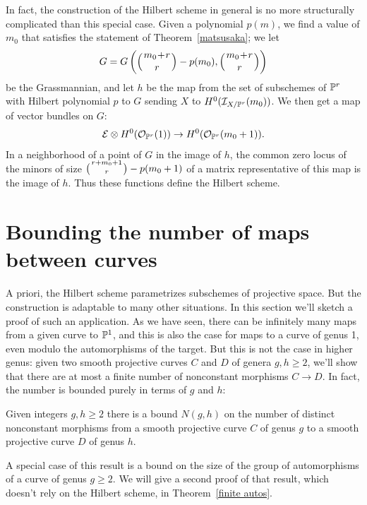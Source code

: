 In fact, the construction of the Hilbert scheme in general is no more
structurally complicated than this special case. Given a polynomial
$p(m)$, we find a value of $m_0$ that satisfies the statement of
Theorem~\ref{matsusaka}; we let
%
$$
G = G\left(\mbinom{m_0+r}{r} - p(m_0), \mbinom{m_0+r}{r} \right)
$$
be the Grassmannian, and let $h$ be the map from the set of
subschemes of ${\mathbb P}^r$ with Hilbert polynomial $p$ to $G$ sending $X$
to $H^0({\mathcal I}_{X/{\mathbb P}^r}(m_0))$. We then get a map of vector bundles  on $G$:
$$
{\mathcal E} \otimes H^0({\mathcal O}_{{\mathbb P}^r}(1)) \to H^0({\mathcal O}_{{\mathbb P}^r}(m_0+1)).
$$
In a neighborhood of a point of $G$ in the image of $h$, the common zero
locus of the minors of size $\tbinom{r+m_0+1}{r} - p(m_0+1)$ of a matrix
representative of this map is the image of $h$. Thus these functions
define the Hilbert scheme.

\section{Bounding the number of maps between curves}
\label{maps between curves}

A priori, the
Hilbert scheme
parametrizes subschemes of projective
%
%
space. But the construction is adaptable to many other situations. In
this section we'll sketch a proof of such an application. As we have seen,
there can be infinitely many maps from a given curve to ${\mathbb P}^{1}$, and
this is also the case for maps to a curve of genus 1, even modulo the
automorphisms of the target. But this is not
the case in higher genus: given two smooth projective curves $C$ and $D$
of genera $g, h \geq 2$, we'll show that there are at most a finite number
of nonconstant morphisms $C \to D$. In fact, the number is bounded purely
in terms of $g$ and $h$:

\begin{theorem}
\label{bounded maps}
Given integers $g,h\geq 2$ there is a bound $N(g,h)$ on the number of
distinct nonconstant morphisms
from a smooth projective curve $C$ of genus $g$ to a smooth projective
curve $D$ of genus $h$.
\end{theorem}

A special case of this result is a bound on the size of the group of
automorphisms of a curve of genus $g\geq 2$. We will give a second
proof of that result, which doesn't rely on the Hilbert scheme, in
Theorem~\ref{finite autos}.

